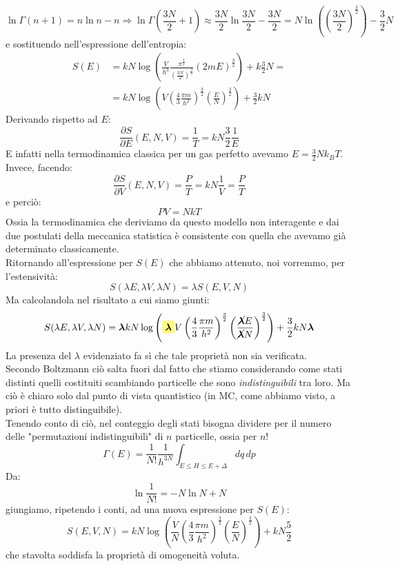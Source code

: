 \documentclass[../MeccanicaStatistica.tex]{subfiles}
\begin{document}
\[
\ln\Gamma(n+1)=n\ln n-n \Rightarrow \ln\Gamma\left(\frac{3N}{2}+1\right)\approx \frac{3N}{2}\ln \frac{3N}{2}-\frac{3N}{2} = N\ln\left(\left(\frac{3N}{2}\right)^{\frac{3}{2}}\right)-\frac{3}{2}N
\]
e sostituendo nell'espressione dell'entropia:
\begin{align*}
S(E)&=kN\log\left(
\frac{V}{h^3}\frac{\pi^{\frac{3}{2}}}{\left(\frac{3N}{2}\right)^{\frac{3}{2}}}
(2mE)^{\frac{3}{2}}
\right)+k\frac{3}{2}N =\\
&= kN\log\left(V\left(\frac{4}{3}\frac{\pi m}{h^2}\right)^{\frac{3}{2}}\left(\frac{E}{N}\right)^{\frac{3}{2}}\right)+\frac{3}{2}kN
\end{align*}
Derivando rispetto ad $E$:
\[
\frac{\partial S}{\partial E}(E,N,V) = \frac{1}{T} = kN\frac{3}{2}\frac{1}{E}
\]
E infatti nella termodinamica classica per un gas perfetto avevamo $E=\frac{3}{2}Nk_B T$.\\
Invece, facendo:
\[
\frac{\partial S}{\partial V}(E,N,V) =\frac{P}{T} = kN\frac{1}{V}=\frac{P}{T}
\]
e perciò:
\[
PV=NkT
\]
Ossia la termodinamica che deriviamo da questo modello non interagente e dai due postulati della meccanica statistica è consistente con quella che avevamo già determinato classicamente.\\
Ritornando all'espressione per $S(E)$ che abbiamo attenuto, noi vorremmo, per l'estensività:
\[
S(\lambda E, \lambda V, \lambda N)=\lambda S(E,V,N)
\]
Ma calcolandola nel risultato a cui siamo giunti:
\[
S(\lambda E, \lambda V, \lambda N)= \bm{\lambda}kN\log\left(\hlc{Yellow}{\bm{\lambda}}V\left(\frac{4}{3}\frac{\pi m}{h^2}\right)^{\frac{3}{2}}\left(\frac{\cancel{\bm{\lambda}} E}{\cancel{\bm{\lambda}}N}\right)^{\frac{3}{2}}\right)+\frac{3}{2}kN\bm{\lambda}
\]
La presenza del $\lambda$ evidenziato fa sì che tale proprietà non sia verificata.\\
Secondo Boltzmann ciò salta fuori dal fatto che stiamo considerando come stati distinti quelli costituiti scambiando particelle che sono \textit{indistinguibili} tra loro. Ma ciò è chiaro solo dal punto di vista quantistico (in MC, come abbiamo visto, a priori è tutto distinguibile).\\
Tenendo conto di ciò, nel conteggio degli stati bisogna dividere per il numero delle "permutazioni indistinguibili" di $n$ particelle, ossia per $n!$
\[
\Gamma(E)=\frac{1}{N!}\frac{1}{h^{3N}}\int_{E\leq H \leq E+\Delta}dq\,dp
\]
Da:
\[
\ln \frac{1}{N!} = -N\ln N+N
\]
giungiamo, ripetendo i conti, ad una nuova espressione per $S(E)$:
\[
S(E,V,N)=kN\log\left(\frac{V}{N}\left(\frac{4}{3}\frac{\pi m}{h^2}\right)^{\frac{3}{2}}\left(\frac{E}{N}\right)^{\frac{3}{2}}\right ) + kN\frac{5}{2}
\]
che stavolta soddisfa la proprietà di omogeneità voluta.
\end{document}
